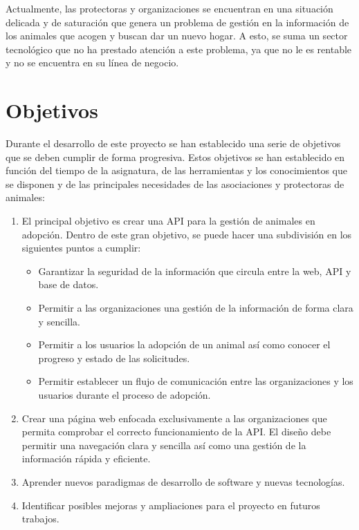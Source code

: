 Actualmente, las protectoras y organizaciones se encuentran en una situación delicada y de saturación que genera un problema de
gestión en la información de los animales que acogen y buscan dar un nuevo hogar. A esto, se suma un
sector tecnológico que no ha prestado atención a este problema, ya que no le es rentable y no se encuentra
en su línea de negocio. \\


\section{Objetivos}\label{sec:objetivos}

Durante el desarrollo de este proyecto se han establecido una serie de objetivos que se deben cumplir de forma
progresiva. Estos objetivos se han establecido en función del tiempo de la asignatura, de las herramientas y los
conocimientos que se disponen y de las principales necesidades de las asociaciones y protectoras de animales: \\

\begin{enumerate}
    \item El principal objetivo es crear una API para la gestión de animales en adopción. Dentro de este gran objetivo,
    se puede hacer una subdivisión en los siguientes puntos a cumplir:
    \begin{itemize}
        \item Garantizar la seguridad de la información que circula entre la web, API y base de datos.
        \item Permitir a las organizaciones una gestión de la información de forma clara y sencilla.
        \item Permitir a los usuarios la adopción de un animal así como conocer el progreso y estado de las solicitudes.
        \item Permitir establecer un flujo de comunicación entre las organizaciones y los usuarios durante el proceso de adopción.
    \end{itemize}
    \item Crear una página web enfocada exclusivamente a las organizaciones que permita comprobar el correcto funcionamiento de la API.
    El diseño debe permitir una navegación clara y sencilla así como una gestión de la información rápida y eficiente.
    \item Aprender nuevos paradigmas de desarrollo de software y nuevas tecnologías.
    \item Identificar posibles mejoras y ampliaciones para el proyecto en futuros trabajos.
\end{enumerate}


